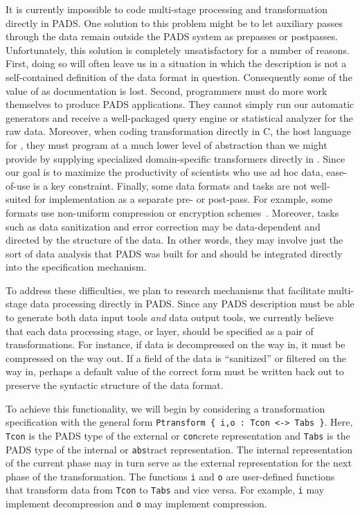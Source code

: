 \documentclass[11pt]{article}
\begin{document}
It is currently impossible to code multi-stage processing and transformation
directly in PADS.  One solution
to this problem might be to let auxiliary passes through the data
remain outside the PADS system as prepasses or postpasses.  
Unfortunately, this solution is completely unsatisfactory for a
number of reasons.  First, doing so
will often leave us in a situation in which the \pads{} description 
is not a self-contained
definition of the data format in question.  Consequently some of the value
of \pads{} as documentation is lost.  
Second, programmers must do
more work themselves to produce PADS applications.  They cannot
simply run our automatic generators and receive a well-packaged 
query engine or statistical analyzer for the raw data.
Moreover, when coding transformation directly in C, the host language
for \pads{}, they must program at a much lower level of abstraction
than we might provide by supplying specialized domain-specific
transformers directly in \pads.
Since our goal is to maximize the productivity of scientists 
who use ad hoc data, ease-of-use is a key constraint.
Finally, some data formats and
tasks are not well-suited for implementation as a separate pre- or post-pass.
For example, some formats use non-uniform compression or encryption 
schemes~\cite{korn+:delta,korn+:data-format}.
Moreover, tasks such as data sanitization and error correction may be
data-dependent and directed by the structure of the data.  In other words,
they may involve just the sort of data analysis that PADS was built for
and should be integrated directly into the specification mechanism.

To address these difficulties,
we plan to research mechanisms that facilitate multi-stage data processing 
directly in PADS.  Since any PADS description must be able to generate 
both data
input tools {\em and} data output tools, we currently believe that each
data processing stage, or layer, should be specified as a pair of
transformations.  For instance, if data is decompressed on the way in,
it must be compressed on the way out.  If a field of the data is ``sanitized''
or filtered on the way in, perhaps a default value of the correct form must
be written back out to preserve the syntactic structure of the data format.

To achieve this functionality, we will begin by considering a
transformation specification with the general form 
\texttt{Ptransform \{ i,o :  Tcon <-> Tabs \}}.
Here, {\tt Tcon} is the PADS type of the external or {\tt con}crete
representation and {\tt Tabs} is the PADS type of the internal or 
{\tt abs}tract representation.  The internal representation of the current
phase may in turn serve as the external representation for the next
phase of the transformation.  The functions {\tt i} and {\tt o} are
user-defined functions that transform data from {\tt Tcon} to 
{\tt Tabs} and vice versa.  For example, {\tt i} may implement
decompression and {\tt o} may implement compression.
\end{document}
